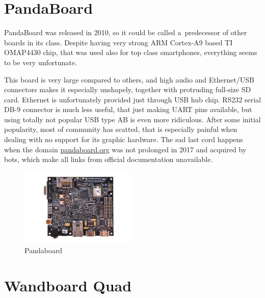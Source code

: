 \documentclass[printmode]{mgr}
\begin{document}
\section{PandaBoard}

PandaBoard was released in 2010, so it could be called a~predecessor of other boards in its class. Despite having very strong ARM Cortex-A9 based TI OMAP4430 chip, that was used also for top class smartphones, everything seems to be very unfortunate.

This board is very large compared to others, and high audio and Ethernet/USB connectors makes it especially unshapely, together with protruding full-size SD card. Ethernet is unfortunately provided just through USB hub chip. RS232 serial DB-9 connector is much less useful, that just making UART pins available, but using totally not popular USB type AB is even more ridiculous. After some initial popularity, most of community has scatted, that is especially painful when dealing with no support for its graphic hardware. The sad last cord happens when the domain \url{pandaboard.org} was not prolonged in 2017 and acquired by bots, which make all links from official documentation unavailable.

\begin{figure}[htbp]
  \centering
    \includegraphics[width=0.5\textwidth]{pandaboard-front.png}
  \caption{Pandaboard}
  \label{fig:devboard-pandaboard}
\end{figure}





\section{Wandboard Quad}
\end{document}
